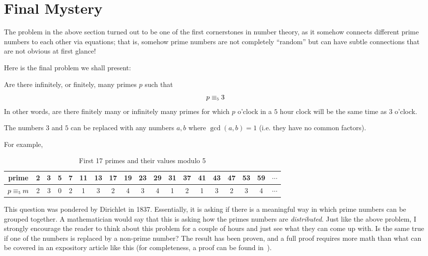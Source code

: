 \documentclass[oneside]{book}
\newcommand\scalemath[2]{\scalebox{#1}{\mbox{\ensuremath{\displaystyle #2}}}}
\newcommand{\Equiv}[1]{\equiv_{\scalemath{0.6}{#1}}}
\newcommand{\qn}{\quad\newline}
\begin{document}
\section{Final Mystery}


The problem in the above section turned out to be one of the first cornerstones in number theory, as it
somehow connects different prime numbers to each other via equations; that is, somehow prime numbers are not
completely ``random'' but can have subtle connections that are not obvious at first glance!

Here is the final problem we shall present:
  \begin{titledBox*}{}
      Are there infinitely, or finitely, many primes $p$ such that
    \[
      p\Equiv{5}3
    \]
    In other words, are there finitely many or infinitely many primes for which $p$ o'clock
    in a $5$ hour clock will be the same time as $3$ o'clock.

    \qn
    The numbers $3$ and $5$ can be replaced with any numbers $a,b$ where $\gcd(a,b) = 1$ (i.e. they have no common
    factors).
  \end{titledBox*}

For example,
\begin{table}[H]
\centering
\begin{tabular}{|c|c|c|c|c|c|c|c|c|c|c|c|c|c|c|c|c|c|c|}
\hline
prime & 2 & \cellcolor{green!20}3 & 5 & 7 & 11 & \cellcolor{green!20}13 & 17 & 19 & \cellcolor{green!20}23
      & 29 & 31 & 37 & 41 & \cellcolor{green!20}43 & 47&\cellcolor{green!20} 53 & 59 &$\cdots$ \\
\hline
$p\Equiv{5}m$&2 & \cellcolor{green!20}3 & 0 & 2 & 1 & \cellcolor{green!20}3 & 2 & 4 & \cellcolor{green!20}3
             & 4 & 1 & 2 & 1 & \cellcolor{green!20}3 & 2 & \cellcolor{green!20} 3 & 4 &$\cdots$\\
\hline
\end{tabular}
\caption{First 17 primes and their values modulo 5}
\end{table}


This question was pondered by Dirichlet in 1837. Essentially, it is asking if there is a meaningful way in
which prime numbers can be grouped together. A mathematician would say that this is asking how the primes
numbers are \emph{distributed}. Just like the above problem, I strongly encourage the reader to think about
this problem for a couple of hours and just see what they can come up with. Is the same true if one of the
numbers is replaced by a non-prime number? The result has been proven, and a full proof requires more math
than what can be covered in an expository article like this (for completeness, a proof can be found
in~\cite{NateCFT}).




\newpage
\printbibliography %
\end{document}
